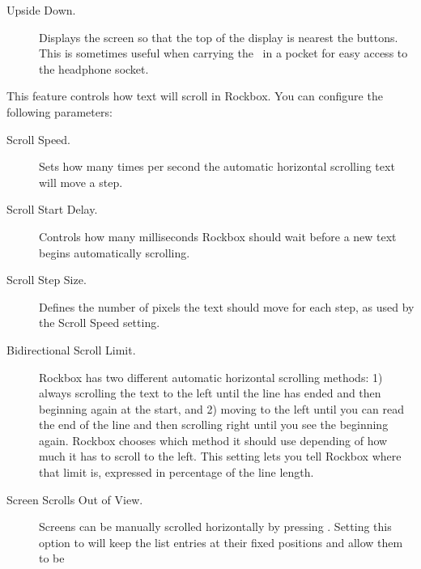 \begin{description}
{\begin{description}
       \item[Upside Down.]
         Displays the screen so that the top of the display is nearest
         the buttons. This is sometimes useful when carrying the \dap\ in a
         pocket for easy access to the headphone socket.
    \end{description}
  }
%
  \item[Scrolling.]
    This feature controls how text will scroll in Rockbox. You can configure
    the following parameters:
    \begin{description}
    \item[Scroll Speed.]
      Sets how many times per second the automatic horizontal scrolling text
      will move a step.
    \item[Scroll Start Delay.]
      Controls how many milliseconds Rockbox should wait before a new
      text begins automatically scrolling.
      \item[Scroll Step Size.]
        Defines the number of pixels the text should move for each step, as used
        by the Scroll Speed setting.
    \item[Bidirectional Scroll Limit.]
      Rockbox has two different automatic horizontal scrolling methods: 1) always
      scrolling the text to the left until the line has ended and then beginning
      again at the start, and 2) moving to the left until you can read the end of
      the line and then scrolling right until you see the beginning again.
      Rockbox chooses which method it should use depending of how much it has to
      scroll to the left. This setting lets you tell Rockbox where that limit
      is, expressed in percentage of the line length.
    \item[Screen Scrolls Out of View.]
      Screens can be manually scrolled horizontally by pressing
      .
      Setting this option to 
      will keep the list entries at their fixed positions and allow them to be

\end{description}
\end{description}
